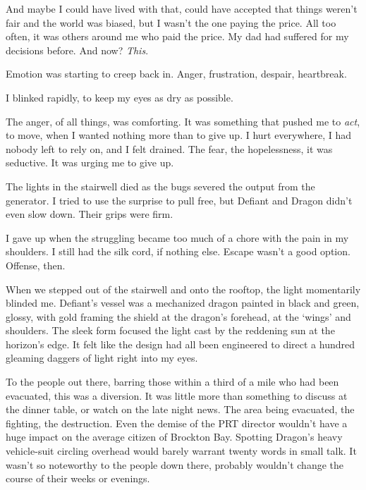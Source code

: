 And maybe I could have lived with that, could have accepted that things weren't fair and the world was biased, but I wasn't the one paying the price.  All too often, it was others around me who paid the price.  My dad had suffered for my decisions before.  And now?  \emph{This}.



Emotion was starting to creep back in.  Anger, frustration, despair, heartbreak.



I blinked rapidly, to keep my eyes as dry as possible.



The anger, of all things, was comforting.  It was something that pushed me to \emph{act}, to move, when I wanted nothing more than to give up.  I hurt everywhere, I had nobody left to rely on, and I felt drained.  The fear, the hopelessness, it was seductive.  It was urging me to give up.



The lights in the stairwell died as the bugs severed the output from the generator.  I tried to use the surprise to pull free, but Defiant and Dragon didn't even slow down.  Their grips were firm.



I gave up when the struggling became too much of a chore with the pain in my shoulders.  I still had the silk cord, if nothing else.  Escape wasn't a good option.  Offense, then.



When we stepped out of the stairwell and onto the rooftop, the light momentarily blinded me.  Defiant's vessel was a mechanized dragon painted in black and green, glossy, with gold framing the shield at the dragon's forehead, at the `wings' and shoulders.  The sleek form focused the light cast by the reddening sun at the horizon's edge.  It felt like the design had all been engineered to direct a hundred gleaming daggers of light right into my eyes.



To the people out there, barring those within a third of a mile who had been evacuated, this was a diversion.  It was little more than something to discuss at the dinner table, or watch on the late night news.  The area being evacuated, the fighting, the destruction.  Even the demise of the PRT director wouldn't have a huge impact on the average citizen of Brockton Bay.  Spotting Dragon's heavy vehicle-suit circling overhead would barely warrant twenty words in small talk.  It wasn't so noteworthy to the people down there, probably wouldn't change the course of their weeks or evenings.



